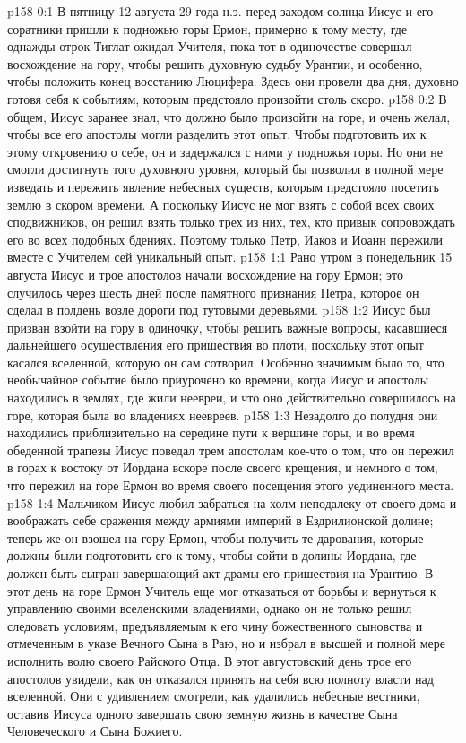 \vs p158 0:1 В пятницу 12 августа 29 года н.э. перед заходом солнца Иисус и его соратники пришли к подножью горы Ермон, примерно к тому месту, где однажды отрок Тиглат ожидал Учителя, пока тот в одиночестве совершал восхождение на гору, чтобы решить духовную судьбу Урантии, и особенно, чтобы положить конец восстанию Люцифера. Здесь они провели два дня, духовно готовя себя к событиям, которым предстояло произойти столь скоро.
\vs p158 0:2 В общем, Иисус заранее знал, что должно было произойти на горе, и очень желал, чтобы все его апостолы могли разделить этот опыт. Чтобы подготовить их к этому откровению о себе, он и задержался с ними у подножья горы. Но они не смогли достигнуть того духовного уровня, который бы позволил в полной мере изведать и пережить явление небесных существ, которым предстояло посетить землю в скором времени. А поскольку Иисус не мог взять с собой всех своих сподвижников, он решил взять только трех из них, тех, кто привык сопровождать его во всех подобных бдениях. Поэтому только Петр, Иаков и Иоанн пережили вместе с Учителем сей уникальный опыт.
\vs p158 1:1 Рано утром в понедельник 15 августа Иисус и трое апостолов начали восхождение на гору Ермон; это случилось через шесть дней после памятного признания Петра, которое он сделал в полдень возле дороги под тутовыми деревьями.
\vs p158 1:2 Иисус был призван взойти на гору в одиночку, чтобы решить важные вопросы, касавшиеся дальнейшего осуществления его пришествия во плоти, поскольку этот опыт касался вселенной, которую он сам сотворил. Особенно значимым было то, что необычайное событие было приурочено ко времени, когда Иисус и апостолы находились в землях, где жили неевреи, и что оно действительно совершилось на горе, которая была во владениях неевреев.
\vs p158 1:3 Незадолго до полудня они находились приблизительно на середине пути к вершине горы, и во время обеденной трапезы Иисус поведал трем апостолам кое\hyp{}что о том, что он пережил в горах к востоку от Иордана вскоре после своего крещения, и немного о том, что пережил на горе Ермон во время своего посещения этого уединенного места.
\vs p158 1:4 Мальчиком Иисус любил забраться на холм неподалеку от своего дома и воображать себе сражения между армиями империй в Ездрилионской долине; теперь же он взошел на гору Ермон, чтобы получить те дарования, которые должны были подготовить его к тому, чтобы сойти в долины Иордана, где должен быть сыгран завершающий акт драмы его пришествия на Урантию. В этот день на горе Ермон Учитель еще мог отказаться от борьбы и вернуться к управлению своими вселенскими владениями, однако он не только решил следовать условиям, предъявляемым к его чину божественного сыновства и отмеченным в указе Вечного Сына в Раю, но и избрал в высшей и полной мере исполнить волю своего Райского Отца. В этот августовский день трое его апостолов увидели, как он отказался принять на себя всю полноту власти над вселенной. Они с удивлением смотрели, как удалились небесные вестники, оставив Иисуса одного завершать свою земную жизнь в качестве Сына Человеческого и Сына Божиего.
